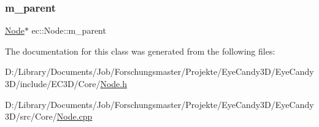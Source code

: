 \subsubsection{\texorpdfstring{m\+\_\+parent}{m\_parent}}
{\footnotesize\ttfamily \mbox{\hyperlink{classec_1_1_node}{Node}}$\ast$ ec\+::\+Node\+::m\+\_\+parent\hspace{0.3cm}{\ttfamily [protected]}}



The documentation for this class was generated from the following files\+:\begin{DoxyCompactItemize}
\item 
D\+:/\+Library/\+Documents/\+Job/\+Forschungsmaster/\+Projekte/\+Eye\+Candy3\+D/\+Eye\+Candy3\+D/include/\+E\+C3\+D/\+Core/\mbox{\hyperlink{_node_8h}{Node.\+h}}\item 
D\+:/\+Library/\+Documents/\+Job/\+Forschungsmaster/\+Projekte/\+Eye\+Candy3\+D/\+Eye\+Candy3\+D/src/\+Core/\mbox{\hyperlink{_node_8cpp}{Node.\+cpp}}\end{DoxyCompactItemize}
